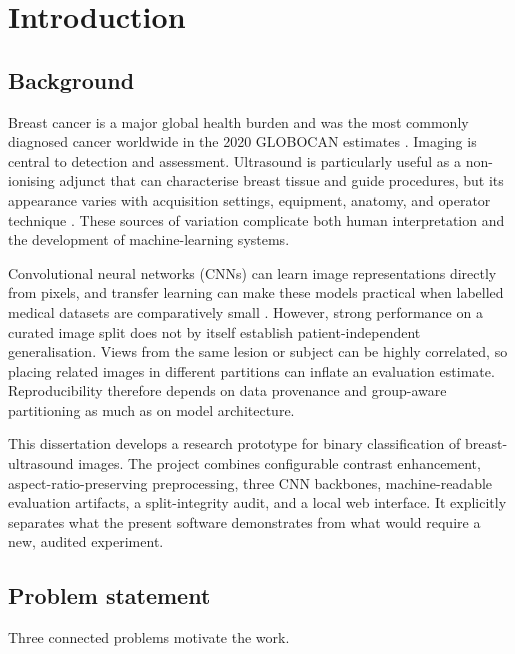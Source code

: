 \chapter{Introduction}
\label{ch:introduction}

\section{Background}
Breast cancer is a major global health burden and was the most commonly diagnosed cancer worldwide in the 2020 GLOBOCAN estimates \citep{Sung2021}. Imaging is central to detection and assessment. Ultrasound is particularly useful as a non-ionising adjunct that can characterise breast tissue and guide procedures, but its appearance varies with acquisition settings, equipment, anatomy, and operator technique \citep{Stavros1995,AlDhabyani2020}. These sources of variation complicate both human interpretation and the development of machine-learning systems.

Convolutional neural networks (CNNs) can learn image representations directly from pixels, and transfer learning can make these models practical when labelled medical datasets are comparatively small \citep{Litjens2017,He2016,Tan2019}. However, strong performance on a curated image split does not by itself establish patient-independent generalisation. Views from the same lesion or subject can be highly correlated, so placing related images in different partitions can inflate an evaluation estimate. Reproducibility therefore depends on data provenance and group-aware partitioning as much as on model architecture.

This dissertation develops a research prototype for binary classification of breast-ultrasound images. The project combines configurable contrast enhancement, aspect-ratio-preserving preprocessing, three CNN backbones, machine-readable evaluation artifacts, a split-integrity audit, and a local web interface. It explicitly separates what the present software demonstrates from what would require a new, audited experiment.

\section{Problem statement}
Three connected problems motivate the work.

